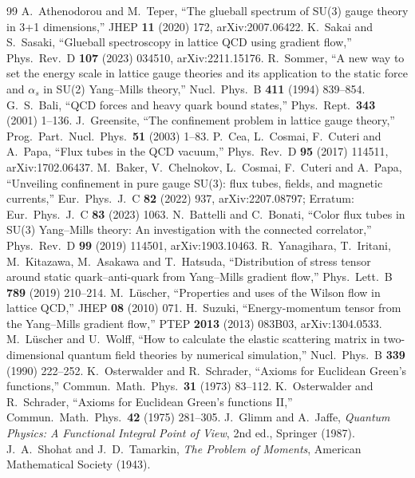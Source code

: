\documentclass[11pt,a4paper]{article}
\theoremstyle{definition}
\theoremstyle{remark}
\begin{document}
\begin{thebibliography}{99}
 A.~Athenodorou and M.~Teper, ``The glueball spectrum of SU(3) gauge theory in 3+1 dimensions,'' JHEP \textbf{11} (2020) 172, arXiv:2007.06422.
 K.~Sakai and S.~Sasaki, ``Glueball spectroscopy in lattice QCD using gradient flow,'' Phys.\ Rev.\ D \textbf{107} (2023) 034510, arXiv:2211.15176.
 R.~Sommer, ``A new way to set the energy scale in lattice gauge theories and its application to the static force and $\alpha_s$ in SU(2) Yang--Mills theory,'' Nucl.\ Phys.\ B \textbf{411} (1994) 839--854.
 G.~S.~Bali, ``QCD forces and heavy quark bound states,'' Phys.\ Rept.\ \textbf{343} (2001) 1--136.
 J.~Greensite, ``The confinement problem in lattice gauge theory,'' Prog.\ Part.\ Nucl.\ Phys.\ \textbf{51} (2003) 1--83.
 P.~Cea, L.~Cosmai, F.~Cuteri and A.~Papa, ``Flux tubes in the QCD vacuum,'' Phys.\ Rev.\ D \textbf{95} (2017) 114511, arXiv:1702.06437.
 M.~Baker, V.~Chelnokov, L.~Cosmai, F.~Cuteri and A.~Papa, ``Unveiling confinement in pure gauge SU(3): flux tubes, fields, and magnetic currents,'' Eur.\ Phys.\ J.\ C \textbf{82} (2022) 937, arXiv:2207.08797; Erratum: Eur.\ Phys.\ J.\ C \textbf{83} (2023) 1063.
 N.~Battelli and C.~Bonati, ``Color flux tubes in SU(3) Yang--Mills theory: An investigation with the connected correlator,'' Phys.\ Rev.\ D \textbf{99} (2019) 114501, arXiv:1903.10463.
 R.~Yanagihara, T.~Iritani, M.~Kitazawa, M.~Asakawa and T.~Hatsuda, ``Distribution of stress tensor around static quark--anti-quark from Yang--Mills gradient flow,'' Phys.\ Lett.\ B \textbf{789} (2019) 210--214.
 M.~L\"uscher, ``Properties and uses of the Wilson flow in lattice QCD,'' JHEP \textbf{08} (2010) 071.
 H.~Suzuki, ``Energy-momentum tensor from the Yang--Mills gradient flow,'' PTEP \textbf{2013} (2013) 083B03, arXiv:1304.0533.
 M.~L\"uscher and U.~Wolff, ``How to calculate the elastic scattering matrix in two-dimensional quantum field theories by numerical simulation,'' Nucl.\ Phys.\ B \textbf{339} (1990) 222--252.
 K.~Osterwalder and R.~Schrader, ``Axioms for Euclidean Green's functions,'' Commun.\ Math.\ Phys.\ \textbf{31} (1973) 83--112.
 K.~Osterwalder and R.~Schrader, ``Axioms for Euclidean Green's functions II,'' Commun.\ Math.\ Phys.\ \textbf{42} (1975) 281--305.
 J.~Glimm and A.~Jaffe, \emph{Quantum Physics: A Functional Integral Point of View}, 2nd ed., Springer (1987).
 J.~A.~Shohat and J.~D.~Tamarkin, \emph{The Problem of Moments}, American Mathematical Society (1943).

\end{thebibliography}
\end{document}
